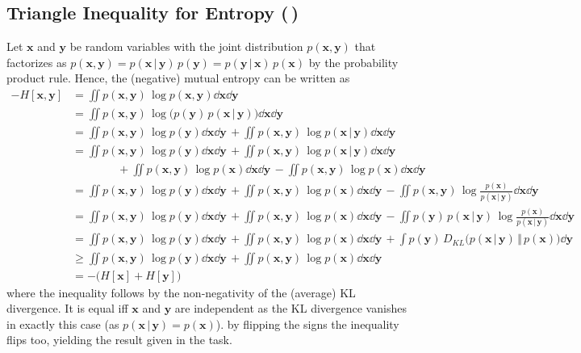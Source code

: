 \documentclass[11pt, a4paper]{scrartcl}
\newcommand{\KL}{D_\mathit{KL}}
\renewcommand{\vec}[1]{\bm{#1}}
\newcommand{\given}{\,\vert\,}
\newcommand{\diffstar}{\texorpdfstring{\raisebox{-1pt}{\resizebox{!}{8pt}{\(\star\)}}}{*}}
\newcommand{\twostar}  {(\diffstar\,\diffstar)}
\begin{document}
		\subsection{Triangle Inequality for Entropy  \twostar}
			Let \( \vec{x} \) and \( \vec{y} \) be random variables with the joint distribution \( p(\vec{x}, \vec{y}) \) that factorizes as \( p(\vec{x}, \vec{y}) = p(\vec{x} \given \vec{y}) \, p(\vec{y}) = p(\vec{y} \given \vec{x}) \, p(\vec{x}) \) by the probability product rule. Hence, the (negative) mutual entropy can be written as
			\begin{align}
				-H[\vec{x}, \vec{y}]
					&= \iint\! p(\vec{x}, \vec{y}) \, \log p(\vec{x}, \vec{y}) \dd{\vec{x}} \dd{\vec{y}} \\
					&= \iint\! p(\vec{x}, \vec{y}) \, \log \big( p(\vec{y}) \, p(\vec{x} \given \vec{y}) \big) \dd{\vec{x}} \dd{\vec{y}} \\
					&= \iint\! p(\vec{x}, \vec{y}) \, \log p(\vec{y}) \dd{\vec{x}} \dd{\vec{y}} \,+ \iint\! p(\vec{x}, \vec{y}) \, \log p(\vec{x} \given \vec{y}) \dd{\vec{x}} \dd{\vec{y}} \\
					&= \iint\! p(\vec{x}, \vec{y}) \, \log p(\vec{y}) \dd{\vec{x}} \dd{\vec{y}} \,+ \iint\! p(\vec{x}, \vec{y}) \, \log p(\vec{x} \given \vec{y}) \dd{\vec{x}} \dd{\vec{y}} \\
						&\qquad\qquad + \iint\! p(\vec{x}, \vec{y}) \, \log p(\vec{x}) \dd{\vec{x}} \dd{\vec{y}} \,- \iint\! p(\vec{x}, \vec{y}) \, \log p(\vec{x}) \dd{\vec{x}} \dd{\vec{y}} \\
					&= \iint\! p(\vec{x}, \vec{y}) \, \log p(\vec{y}) \dd{\vec{x}} \dd{\vec{y}} \,+ \iint\! p(\vec{x}, \vec{y}) \, \log p(\vec{x}) \dd{\vec{x}} \dd{\vec{y}} \,- \iint\! p(\vec{x}, \vec{y}) \, \log \frac{p(\vec{x})}{p(\vec{x} \given \vec{y})} \dd{\vec{x}} \dd{\vec{y}} \\
					&= \iint\! p(\vec{x}, \vec{y}) \, \log p(\vec{y}) \dd{\vec{x}} \dd{\vec{y}} \,+ \iint\! p(\vec{x}, \vec{y}) \, \log p(\vec{x}) \dd{\vec{x}} \dd{\vec{y}} \,- \iint\! p(\vec{y}) \, p(\vec{x} \given \vec{y}) \, \log \frac{p(\vec{x})}{p(\vec{x} \given \vec{y})} \dd{\vec{x}} \dd{\vec{y}} \\
					&= \iint\! p(\vec{x}, \vec{y}) \, \log p(\vec{y}) \dd{\vec{x}} \dd{\vec{y}} \,+ \iint\! p(\vec{x}, \vec{y}) \, \log p(\vec{x}) \dd{\vec{x}} \dd{\vec{y}} \,+ \int\! p(\vec{y}) \, \KL\big( p(\vec{x} \given \vec{y}) \,\Vert\, p(\vec{x}) \big) \dd{\vec{y}} \\
					&\geq \iint\! p(\vec{x}, \vec{y}) \, \log p(\vec{y}) \dd{\vec{x}} \dd{\vec{y}} \,+ \iint\! p(\vec{x}, \vec{y}) \, \log p(\vec{x}) \dd{\vec{x}} \dd{\vec{y}} \\
					&= -\big( H[\vec{x}] + H[\vec{y}] \big)
			\end{align}
			where the inequality follows by the non-negativity of the (average) KL divergence. It is equal iff \(\vec{x}\) and \(\vec{y}\) are independent as the KL divergence vanishes in exactly this case (as \( p(\vec{x} \given \vec{y}) = p(\vec{x}) \)). by flipping the signs the inequality flips too, yielding the result given in the task.
\end{document}
